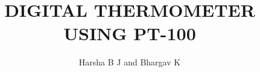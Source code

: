 \documentclass[journal,12pt,twocolumn]{IEEEtran}
\DeclareMathOperator*{\Res}{Res}
\begin{document}
\newtheorem{theorem}{Theorem}[section]
\newtheorem{problem}{Problem}
\newtheorem{proposition}{Proposition}[section]
\newtheorem{lemma}{Lemma}[section]
\newtheorem{corollary}[theorem]{Corollary}
\newtheorem{example}{Example}[section]
\newtheorem{definition}[problem]{Definition}
\newcommand{\BEQA}{\begin{eqnarray}}
\newcommand{\EEQA}{\end{eqnarray}}
\newcommand{\define}{\stackrel{\triangle}{=}}

\providecommand{\mbf}{\mathbf}
\providecommand{\pr}[1]{\ensuremath{\Pr\left(#1\right)}}
\providecommand{\qfunc}[1]{\ensuremath{Q\left(#1\right)}}
\providecommand{\sbrak}[1]{\ensuremath{{}\left[#1\right]}}
\providecommand{\lsbrak}[1]{\ensuremath{{}\left[#1\right.}}
\providecommand{\rsbrak}[1]{\ensuremath{{}\left.#1\right]}}
\providecommand{\brak}[1]{\ensuremath{\left(#1\right)}}
\providecommand{\lbrak}[1]{\ensuremath{\left(#1\right.}}
\providecommand{\rbrak}[1]{\ensuremath{\left.#1\right)}}
\providecommand{\cbrak}[1]{\ensuremath{\left\{#1\right\}}}
\providecommand{\lcbrak}[1]{\ensuremath{\left\{#1\right.}}
\providecommand{\rcbrak}[1]{\ensuremath{\left.#1\right\}}}
\theoremstyle{remark}
\newtheorem{rem}{Remark}
\newcommand{\sgn}{\mathop{\mathrm{sgn}}}
\providecommand{\abs}[1]{\left\vert#1\right\vert}
\providecommand{\res}[1]{\Res\displaylimits_{#1}} 
\providecommand{\norm}[1]{\left\lVert#1\right\rVert}
\providecommand{\mtx}[1]{\mathbf{#1}}
\providecommand{\mean}[1]{E\left[ #1 \right]}
\providecommand{\fourier}{\overset{\mathcal{F}}{ \rightleftharpoons}}
\providecommand{\system}[1]{\overset{\mathcal{#1}}{ \longleftrightarrow}}
\newcommand{\solution}{\noindent \textbf{Solution: }}
\newcommand{\cosec}{\,\text{cosec}\,}
\providecommand{\dec}[2]{\ensuremath{\overset{#1}{\underset{#2}{\gtrless}}}}
\newcommand{\myvec}[1]{\ensuremath{\begin{pmatrix}#1\end{pmatrix}}}
\newcommand{\mydet}[1]{\ensuremath{\begin{vmatrix}#1\end{vmatrix}}}
\renewcommand{\vec}[1]{\boldsymbol{\mathbf{#1}}}
\def\putbox#1#2#3{\makebox[0in][l]{\makebox[#1][l]{}\raisebox{\baselineskip}[0in][0in]{\raisebox{#2}[0in][0in]{#3}}}}
     \def\rightbox#1{\makebox[0in][r]{#1}}
     \def\centbox#1{\makebox[0in]{#1}}
     \def\topbox#1{\raisebox{-\baselineskip}[0in][0in]{#1}}
     \def\midbox#1{\raisebox{-0.5\baselineskip}[0in][0in]{#1}}

\vspace{3cm}
\title{DIGITAL THERMOMETER USING PT-100}
\author{Harsha B J and Bhargav K}
\maketitle
\tableofcontents
\bigskip
\end{document}
